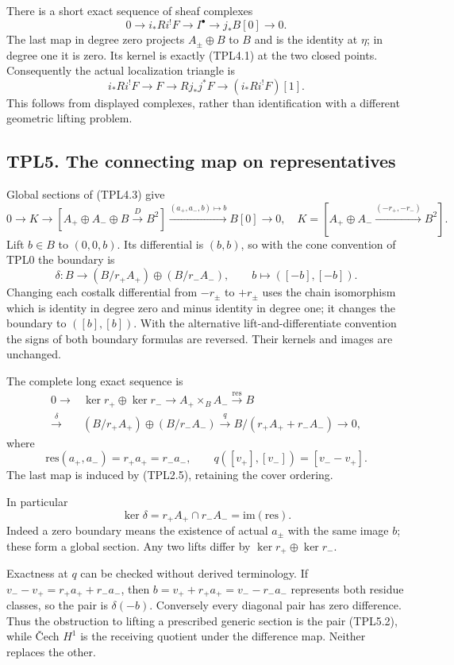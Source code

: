 There is a short exact sequence of sheaf complexes \[
0\to i_*Ri^!F\to I^\bullet\to j_*B[0]\to0.
\tag{TPL4.3}
\] The last map in degree zero projects \(A_\pm\oplus B\) to \(B\) and
is the identity at \(\eta\); in degree one it is zero. Its kernel is
exactly (TPL4.1) at the two closed points. Consequently the actual
localization triangle is \[
\boxed{i_*Ri^!F\to F\to Rj_*j^*F\to(i_*Ri^!F)[1].}
\tag{TPL4.4}
\] This follows from displayed complexes, rather than identification
with a different geometric lifting problem.

\subsection{TPL5. The connecting map on
representatives}\label{tpl5.-the-connecting-map-on-representatives}

Global sections of (TPL4.3) give \[
0\to K\to[A_+\oplus A_-\oplus B\xrightarrow D B^2]
\xrightarrow{(a_+,a_-,b)\mapsto b}B[0]\to0,
\quad K=[A_+\oplus A_-\xrightarrow{(-r_+,-r_-)}B^2].
\tag{TPL5.1}
\] Lift \(b\in B\) to \((0,0,b)\). Its differential is \((b,b)\), so
with the cone convention of TPL0 the boundary is \[
\boxed{\delta:B\to(B/r_+A_+)\oplus(B/r_-A_-),
\qquad b\mapsto([-b],[-b]).}
\tag{TPL5.2}
\] Changing each costalk differential from \(-r_\pm\) to \(+r_\pm\) uses
the chain isomorphism which is identity in degree zero and minus
identity in degree one; it changes the boundary to \(([b],[b])\). With
the alternative lift-and-differentiate convention the signs of both
boundary formulas are reversed. Their kernels and images are unchanged.

The complete long exact sequence is \[
\begin{aligned}
0\to&\ker r_+\oplus\ker r_-\to A_+\times_BA_-
\xrightarrow{\mathrm{res}}B\\
\xrightarrow{\delta}&(B/r_+A_+)\oplus(B/r_-A_-)
\xrightarrow q B/(r_+A_++r_-A_-)\to0,
\end{aligned}
\tag{TPL5.3}
\] where \[
\mathrm{res}(a_+,a_-)=r_+a_+=r_-a_-,
\qquad q([v_+],[v_-])=[v_--v_+].
\tag{TPL5.4}
\] The last map is induced by (TPL2.5), retaining the cover ordering.

In particular \[
\ker\delta=r_+A_+\cap r_-A_-=\mathrm{im}(\mathrm{res}).
\tag{TPL5.5}
\] Indeed a zero boundary means the existence of actual \(a_\pm\) with
the same image \(b\); these form a global section. Any two lifts differ
by \(\ker r_+\oplus\ker r_-\).

Exactness at \(q\) can be checked without derived terminology. If
\(v_--v_+=r_+a_++r_-a_-\), then \(b=v_++r_+a_+=v_--r_-a_-\) represents
both residue classes, so the pair is \(\delta(-b)\). Conversely every
diagonal pair has zero difference. Thus the obstruction to lifting a
prescribed generic section is the pair (TPL5.2), while Čech \(H^1\) is
the receiving quotient under the difference map. Neither replaces the
other.

